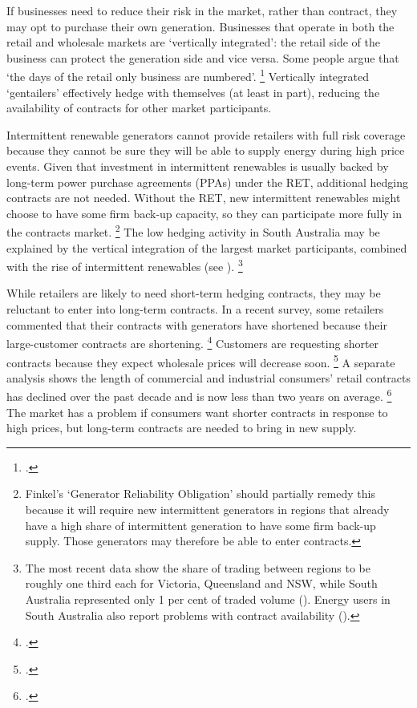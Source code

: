 \documentclass[FrontPage]{grattan}
\begin{document}
If businesses need to reduce their risk in the market, rather than contract, they may opt to purchase their own generation. Businesses that operate in both the retail and wholesale markets are `vertically integrated': the retail side of the business can protect the generation side and vice versa. Some people argue that `the days of the retail only business are numbered'.%
\footcites{Potter2017Powershop}{Simshauser2017IntermittentGeneration}
Vertically integrated `gentailers' effectively hedge with themselves (at least in part), reducing the availability of contracts for other market participants.

Intermittent renewable generators cannot provide retailers with full risk coverage because they cannot be sure they will be able to supply energy during high price events. Given that investment in intermittent renewables is usually backed by long-term power purchase agreements (PPAs) under the RET, additional hedging contracts are not needed. Without the RET, new intermittent renewables might choose to have some firm back-up capacity, so they can participate more fully in the contracts market.%
\footnote{Finkel's `Generator Reliability Obligation' should partially remedy this because it will require new intermittent generators in regions that already have a high share of intermittent generation to have some firm back-up supply. Those generators may therefore be able to enter contracts.}
The low hedging activity in South Australia may be explained by the vertical integration of the largest market participants, combined with the rise of intermittent renewables (see ).%
\footnote{The most recent data show the share of trading between regions to be roughly one third each for Victoria, Queensland and NSW, while South Australia represented only 1 per cent of traded volume (\textcite[][13]{AFMA2016AFMR}). Energy users in South Australia also report problems with contract availability (\textcite[][81]{Finkel2017ReviewFinal}).}

While retailers are likely to need short-term hedging contracts, they may be reluctant to enter into long-term contracts. In a recent survey, some retailers commented that their contracts with generators have shortened because their large-customer contracts are shortening.%
\footcite[][60]{AEMC2017RetailCompReview}
Customers are requesting shorter contracts because they expect wholesale prices will decrease soon.%
\footcite[][60]{AEMC2017RetailCompReview}
A separate analysis shows the length of commercial and industrial consumers' retail contracts has declined over the past decade and is now less than two years on average.%
\footcite{Simshauser2017IntermittentGeneration}
The market has a problem if consumers want shorter contracts in response to high prices, but long-term contracts are needed to bring in new supply.
\end{document}
